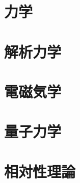 \documentclass[a4j]{jsbook}
\begin{document}
%
%

%
%
\chapter{力学}




%
%
\chapter{解析力学}






%
%
\chapter{電磁気学}







%
%
\chapter{量子力学}






%
%
%
%
\chapter{相対性理論}



\end{document}
